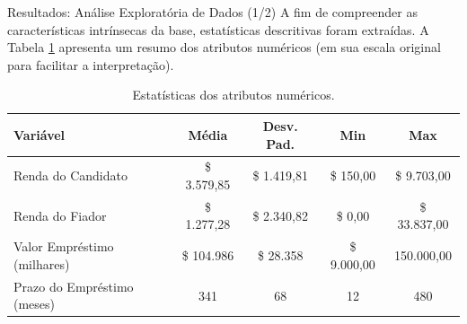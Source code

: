 \documentclass[aspectratio=169]{beamer}
\begin{document}
\begin{frame}{Resultados: Análise Exploratória de Dados (1/2)}
A fim de compreender as características intrínsecas da base, estatísticas descritivas foram extraídas. A Tabela \ref{tab:1} apresenta um resumo dos atributos numéricos (em sua escala original para facilitar a interpretação).

\begin{table}[htbp]
    \centering
    \caption{Estatísticas dos atributos numéricos.}
    {\small
    \begin{tabular}{l|c|c|c|c} 
          \hline \hline
        \textbf{Variável} & \textbf{Média} & \textbf{Desv. Pad.}   & \textbf{Min} & \textbf{Max} \\ 
          \hline \hline
        Renda do Candidato                 & \$ 3.579,85 & \$ 1.419,81  & \$ 150,00     & \$ 9.703,00 \\
        Renda do Fiador                    & \$ 1.277,28 & \$ 2.340,82  & \$ 0,00       & \$ 33.837,00 \\
        Valor Empréstimo (milhares)        & \$ 104.986   & \$ 28.358   & \$ 9.000,00   & 150.000,00 \\
        Prazo do Empréstimo (meses)        & 341          &  68         & 12            & 480 \\
          \hline \hline
    \end{tabular}
    }
    \label{tab:1}
\end{table}
\end{frame}
\end{document}

